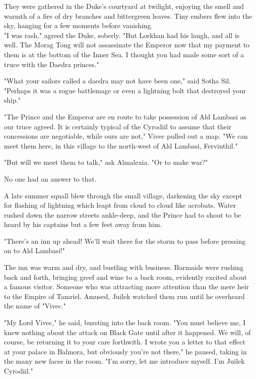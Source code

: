 \clearpage
{}

\dropcap They were gathered in the Duke's courtyard at twilight, enjoying the smell and warmth of a fire of dry branches and bittergreen leaves. Tiny embers flew into the sky, hanging for a few moments before vanishing.\\"I was rash," agreed the Duke, soberly. "But Lorkhan had his laugh, and all is well. The Morag Tong will not assassinate the Emperor now that my payment to them is at the bottom of the Inner Sea. I thought you had made some sort of a truce with the Daedra princes."

"What your sailors called a daedra may not have been one," said Sotha Sil. "Perhaps it was a rogue battlemage or even a lightning bolt that destroyed your ship."

"The Prince and the Emperor are en route to take possession of Ald Lambasi as our truce agreed. It is certainly typical of the Cyrodiil to assume that their concessions are negotiable, while ours are not," Vivec pulled out a map. "We can meet them here, in this village to the north-west of Ald Lambasi, Fervinthil."

"But will we meet them to talk," ask Almalexia. "Or to make war?"

No one had an answer to that.

A late summer squall blew through the small village, darkening the sky except for flashing of lightning which leapt from cloud to cloud like acrobats. Water rushed down the narrow streets ankle-deep, and the Prince had to shout to be heard by his captains but a few feet away from him.

"There's an inn up ahead! We'll wait there for the storm to pass before pressing on to Ald Lambasi!"

The inn was warm and dry, and bustling with business. Barmaids were rushing back and forth, bringing greef and wine to a back room, evidently excited about a famous visitor. Someone who was attracting more attention than the mere heir to the Empire of Tamriel. Amused, Juilek watched them run until he overheard the name of "Vivec."

"My Lord Vivec," he said, bursting into the back room. "You must believe me, I knew nothing about the attack on Black Gate until after it happened. We will, of course, be returning it to your care forthwith. I wrote you a letter to that effect at your palace in Balmora, but obviously you're not there," he paused, taking in the many new faces in the room. "I'm sorry, let me introduce myself. I'm Juilek Cyrodiil."

